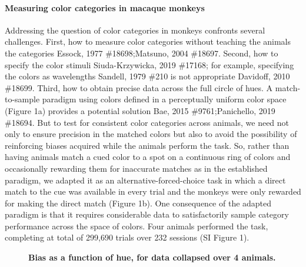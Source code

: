 \paragraph{Measuring color categories in macaque monkeys}
Addressing the question of color categories in monkeys confronts several challenges. First, how to measure color categories without teaching the animals the categories {Essock, 1977 \#18698;Matsuno, 2004 \#18697}. Second, how to specify the color stimuli {Siuda-Krzywicka, 2019 \#17168}; for example, specifying the colors as wavelengths {Sandell, 1979 \#210} is not appropriate {Davidoff, 2010 \#18699}. Third, how to obtain precise data across the full circle of hues. A match-to-sample paradigm using colors defined in a perceptually uniform color space (Figure 1a) provides a potential solution {Bae, 2015 \#9761;Panichello, 2019 \#18694}.  But to test for consistent color categories across animals, we need not only to ensure precision in the matched colors but also to avoid the possibility of reinforcing biases acquired while the animals perform the task. So, rather than having animals match a cued color to a spot on a continuous ring of colors and occasionally rewarding them for inaccurate matches as in the established paradigm, we adapted it as an alternative-forced-choice task in which a direct match to the cue was available in every trial and the monkeys were only rewarded for making the direct match (Figure 1b). One consequence of the adapted paradigm is that it requires considerable data to satisfactorily sample category performance across the space of colors. Four animals performed the task, completing at total of 299,690 trials over 232 sessions (SI Figure 1).

\begin{figure}
    \centering
        \begin{subfigure}[t]{0.36\textwidth}
         \centering
         \caption{}
         
         \label{fig:CombinedLinear}
    \end{subfigure}
    \hfill
    \begin{subfigure}[t]{0.36\textwidth}
         \centering
         \caption{}
         
         \label{fig:CombinedLinear}
    \end{subfigure}
    \hfill
    \begin{subfigure}[t]{0.25\textwidth}
         \centering
         \caption{}
         
         \label{fig:CombinedPolar}
    \end{subfigure}
    \caption{\textbf{Bias as a function of hue, for data collapsed over 4 animals.} 
    }
    \label{fig:AvResults}
\end{figure}

